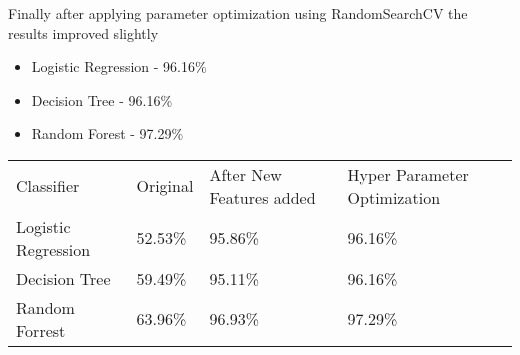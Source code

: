 Finally after applying parameter optimization using RandomSearchCV the results improved slightly

\begin{itemize}
  \item Logistic Regression - 96.16\%
  \item Decision Tree - 96.16\%
  \item Random Forest - 97.29\%
\end{itemize}

\begin{table}[H]
\centering
\begin{tabular}{llll}
\rowcolor[HTML]{9B9B9B} 
Classifier                                  & Original & After New Features added & Hyper Parameter Optimization \\
\cellcolor[HTML]{C0C0C0}Logistic Regression & 52.53\%  & 95.86\%                  & 96.16\%                      \\
\cellcolor[HTML]{C0C0C0}Decision Tree       & 59.49\%  & 95.11\%                  & 96.16\%                      \\
\cellcolor[HTML]{C0C0C0}Random Forrest      & 63.96\%  & 96.93\%                  & 97.29\%                     
\end{tabular}
\end{table}